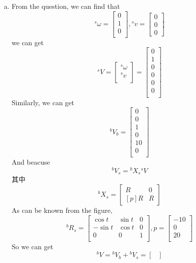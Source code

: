 \begin{enumerate}[(a)]
    \item 
    From the question, we can find that \[^s\omega=\begin{bmatrix}
        0\\1\\0\\
    \end{bmatrix}, {}^sv = \begin{bmatrix}
        0\\0\\0 \end{bmatrix}\]
    we can get \[^sV=\begin{bmatrix}
        ^s\omega \\ ^sv\\
    \end{bmatrix} = \begin{bmatrix}
        0\\1\\0\\0\\0\\0\\
    \end{bmatrix}\]
    Similarly, we can get\[{}^bV_b=\begin{bmatrix}
        0 \\ 0 \\ 1 \\ 0 \\ 10 \\ 0\\
    \end{bmatrix}\]
    And beacuse 
    \[{}^bV_s={}^bX_s{}^sV\]其中\[{}^bX_s = \begin{bmatrix}
        R & 0 \\ [p]R & R
    \end{bmatrix}\]
    As can be known from the figure,\[{}^bR_s = \begin{bmatrix}
        \cos t & \sin t & 0 \\
        -\sin t & \cos t & 0 \\
        0 & 0 & 1\\
    \end{bmatrix}, p = \begin{bmatrix}
        -10 \\ 0 \\ 20 \\ 
    \end{bmatrix}\]
    So we can get \[{}^bV = {}^bV_b + {}^bV_s = \begin{bmatrix}

\end{bmatrix}\]
\end{enumerate}
